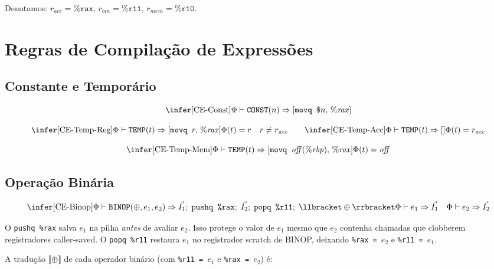 Denotamos:
$r_{\mathit{acc}} = \texttt{\%rax}$,
$r_{\mathit{bin}} = \texttt{\%r11}$,
$r_{\mathit{mem}} = \texttt{\%r10}$.

\section{Regras de Compilação de Expressões}

\subsection{Constante e Temporário}

\[
  \infer[\text{CE-Const}]
  {\Phi \vdash \texttt{CONST}(n) \Rightarrow [\texttt{movq } \$n,\,
  \%\mathit{rax}]}{}
\]

\[
  \infer[\text{CE-Temp-Reg}]
  {\Phi \vdash \texttt{TEMP}(t) \Rightarrow [\texttt{movq } r,\,
  \%\mathit{rax}]}
  {\Phi(t) = r \quad r \neq r_{\mathit{acc}}}
  \qquad
  \infer[\text{CE-Temp-Acc}]
  {\Phi \vdash \texttt{TEMP}(t) \Rightarrow []}
  {\Phi(t) = r_{\mathit{acc}}}
\]

\[
  \infer[\text{CE-Temp-Mem}]
  {\Phi \vdash \texttt{TEMP}(t) \Rightarrow [\texttt{movq }
  \mathit{off}(\%\mathit{rbp}),\, \%\mathit{rax}]}
  {\Phi(t) = \mathit{off}}
\]

\subsection{Operação Binária}

\[
  \infer[\text{CE-Binop}]
  {\Phi \vdash \texttt{BINOP}(\oplus, e_1, e_2) \Rightarrow
    \vec{I_1};\; \texttt{pushq \%rax};\; \vec{I_2};\;
  \texttt{popq \%r11};\; \llbracket\oplus\rrbracket}
  {\Phi \vdash e_1 \Rightarrow \vec{I_1} \quad \Phi \vdash e_2
  \Rightarrow \vec{I_2}}
\]

O \texttt{pushq \%rax} salva $e_1$ na pilha \emph{antes} de avaliar $e_2$.
Isso protege o valor de $e_1$ mesmo que $e_2$ contenha chamadas que
clobberem registradores caller-saved. O \texttt{popq \%r11} restaura $e_1$
no registrador scratch de BINOP, deixando \texttt{\%rax = $e_2$} e
\texttt{\%r11 = $e_1$}.

A tradução $\llbracket\oplus\rrbracket$ de cada operador binário (com
\texttt{\%r11 = $e_1$} e \texttt{\%rax = $e_2$}) é:


